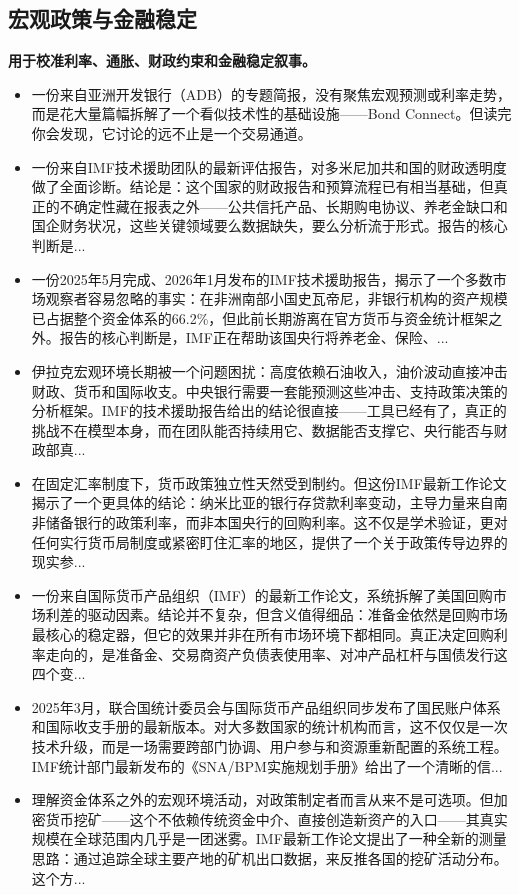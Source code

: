 \documentclass[11pt]{ctexart}
\begin{document}
\subsection{宏观政策与金融稳定}
\textbf{用于校准利率、通胀、财政约束和金融稳定叙事。}
\begin{itemize}
  \item 一份来自亚洲开发银行（ADB）的专题简报，没有聚焦宏观预测或利率走势，而是花大量篇幅拆解了一个看似技术性的基础设施——Bond Connect。但读完你会发现，它讨论的远不止是一个交易通道。
  \item 一份来自IMF技术援助团队的最新评估报告，对多米尼加共和国的财政透明度做了全面诊断。结论是：这个国家的财政报告和预算流程已有相当基础，但真正的不确定性藏在报表之外——公共信托产品、长期购电协议、养老金缺口和国企财务状况，这些关键领域要么数据缺失，要么分析流于形式。报告的核心判断是...
  \item 一份2025年5月完成、2026年1月发布的IMF技术援助报告，揭示了一个多数市场观察者容易忽略的事实：在非洲南部小国史瓦帝尼，非银行机构的资产规模已占据整个资金体系的66.2\%，但此前长期游离在官方货币与资金统计框架之外。报告的核心判断是，IMF正在帮助该国央行将养老金、保险、...
  \item 伊拉克宏观环境长期被一个问题困扰：高度依赖石油收入，油价波动直接冲击财政、货币和国际收支。中央银行需要一套能预测这些冲击、支持政策决策的分析框架。IMF的技术援助报告给出的结论很直接——工具已经有了，真正的挑战不在模型本身，而在团队能否持续用它、数据能否支撑它、央行能否与财政部真...
  \item 在固定汇率制度下，货币政策独立性天然受到制约。但这份IMF最新工作论文揭示了一个更具体的结论：纳米比亚的银行存贷款利率变动，主导力量来自南非储备银行的政策利率，而非本国央行的回购利率。这不仅是学术验证，更对任何实行货币局制度或紧密盯住汇率的地区，提供了一个关于政策传导边界的现实参...
  \item 一份来自国际货币产品组织（IMF）的最新工作论文，系统拆解了美国回购市场利差的驱动因素。结论并不复杂，但含义值得细品：准备金依然是回购市场最核心的稳定器，但它的效果并非在所有市场环境下都相同。真正决定回购利率走向的，是准备金、交易商资产负债表使用率、对冲产品杠杆与国债发行这四个变...
  \item 2025年3月，联合国统计委员会与国际货币产品组织同步发布了国民账户体系和国际收支手册的最新版本。对大多数国家的统计机构而言，这不仅仅是一次技术升级，而是一场需要跨部门协调、用户参与和资源重新配置的系统工程。IMF统计部门最新发布的《SNA/BPM实施规划手册》给出了一个清晰的信...
  \item 理解资金体系之外的宏观环境活动，对政策制定者而言从来不是可选项。但加密货币挖矿——这个不依赖传统资金中介、直接创造新资产的入口——其真实规模在全球范围内几乎是一团迷雾。IMF最新工作论文提出了一种全新的测量思路：通过追踪全球主要产地的矿机出口数据，来反推各国的挖矿活动分布。这个方...
\end{itemize}
\end{document}

